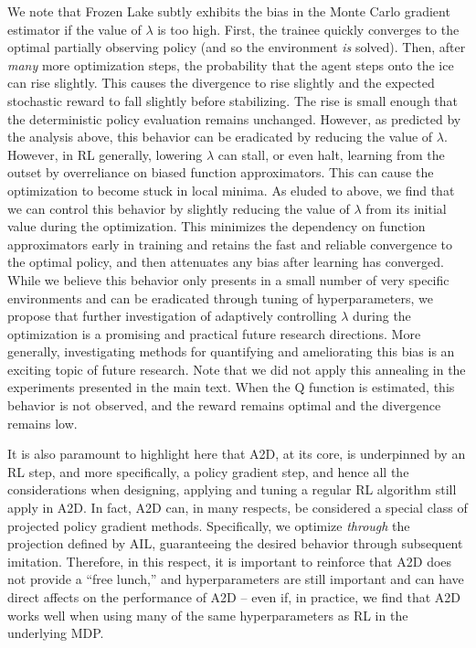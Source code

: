 We note that Frozen Lake subtly exhibits the bias in the Monte Carlo gradient estimator if the value of $\lambda$ is too high.  First, the trainee quickly converges to the optimal partially observing policy (and so the environment \emph{is} solved).   Then, after \emph{many} more optimization steps, the probability that the agent steps onto the ice can rise slightly.  This causes the divergence to rise slightly and the expected stochastic reward to fall slightly before stabilizing.  The rise is small enough that the deterministic policy evaluation remains unchanged.  However, as predicted by the analysis above, this behavior can be eradicated by reducing the value of $\lambda$.  However, in RL generally, lowering $\lambda$ can stall, or even halt, learning from the outset by overreliance on biased function approximators.  This can cause the optimization to become stuck in local minima.  As eluded to above, we find that we can control this behavior by slightly reducing the value of $\lambda$ from its initial value during the optimization.  This minimizes the dependency on function approximators early in training and retains the fast and reliable convergence to the optimal policy, and then attenuates any bias after learning has converged.  While we believe this behavior only presents in a small number of very specific environments and can be eradicated through tuning of hyperparameters, we propose that further investigation of adaptively controlling $\lambda$ during the optimization is a promising and practical future research directions.  More generally, investigating methods for quantifying and ameliorating this bias is an exciting topic of future research.  Note that we did not apply this annealing in the experiments presented in the main text.  When the Q function is estimated, this behavior is not observed, and the reward remains optimal and the divergence remains low.  

It is also paramount to highlight here that A2D, at its core, is underpinned by an RL step, and more specifically, a policy gradient step, and hence all the considerations when designing, applying and tuning a regular RL algorithm still apply in A2D. In fact, A2D can, in many respects, be considered a special class of projected policy gradient methods.  Specifically, we optimize \emph{through} the projection defined by AIL, guaranteeing the desired behavior through subsequent imitation. Therefore, in this respect, it is important to reinforce that A2D does not provide a ``free lunch,'' and hyperparameters are still important and can have direct affects on the performance of A2D -- even if, in practice, we find that A2D works well when using many of the same hyperparameters as RL in the underlying MDP.  

